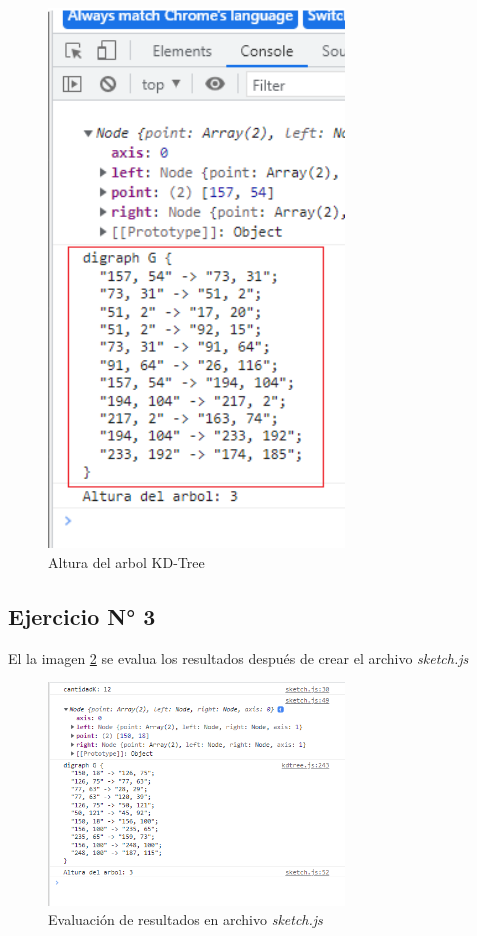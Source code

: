 \documentclass{article}
\begin{document}
\begin{figure}[h!]
	\centering
	\includegraphics[width=0.7\textwidth]{img/ejercicio_02_generate_dot.png}
	\caption{Altura del arbol KD-Tree}
	\label{fig:ejercicio_02_generate_dot}
\end{figure}

\clearpage
\subsection{Ejercicio N° 3}
El la imagen \ref{fig:ejercicio_03} se evalua los resultados después de crear el archivo \textit{sketch.js}
\begin{figure}[h!]
	\centering
	\includegraphics[width=0.7\textwidth]{img/ejercicio_03.png}
	\caption{Evaluación de resultados en archivo \textit{sketch.js}}
	\label{fig:ejercicio_03}
\end{figure}
\end{document}
